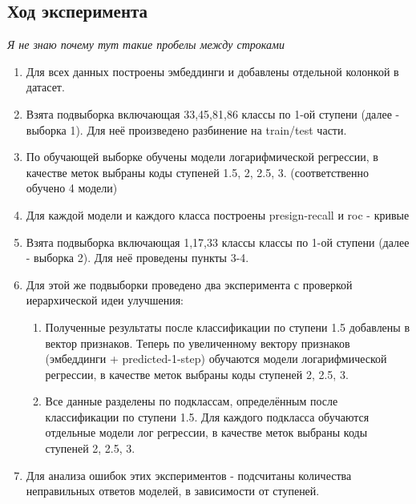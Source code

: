 \documentclass{article}
\begin{document}
\subsection{Ход эксперимента}
\textit{Я не знаю почему тут такие пробелы между строками}
\begin{enumerate}
    \item Для всех данных построены эмбеддинги и добавлены отдельной колонкой в датасет.
    \item Взята подвыборка включающая 33,45,81,86 классы по 1-ой ступени (далее - выборка 1). Для неё произведено разбинение на train/test части. 
    \item По обучающей выборке обучены модели логарифмической регрессии, в качестве меток выбраны коды ступеней 1.5, 2, 2.5, 3. (соответственно обучено 4 модели)
    \item Для каждой модели и каждого класса построены presign-recall и roc - кривые
    \item Взята подвыборка включающая 1,17,33 классы классы по 1-ой ступени (далее - выборка 2). Для неё проведены пункты 3-4.
    \item Для этой же подвыборки проведено два эксперимента с проверкой иерархической идеи улучшения:
    \begin{enumerate}
        \item Полученные результаты после классификации по ступени 1.5 добавлены в вектор признаков. Теперь по увеличенному вектору признаков (эмбеддинги + predicted-1-step) обучаются модели логарифмической регрессии, в качестве меток выбраны коды ступеней 2, 2.5, 3.
        \item Все данные разделены по подклассам, определённым после классификации по ступени 1.5. Для каждого подкласса обучаются отдельные модели лог регрессии,   в качестве меток выбраны коды ступеней 2, 2.5, 3.
    \end{enumerate}
    \item Для анализа ошибок этих экспериментов - подсчитаны количества неправильных ответов моделей, в зависимости от ступеней. 
\end{enumerate}
\end{document}
